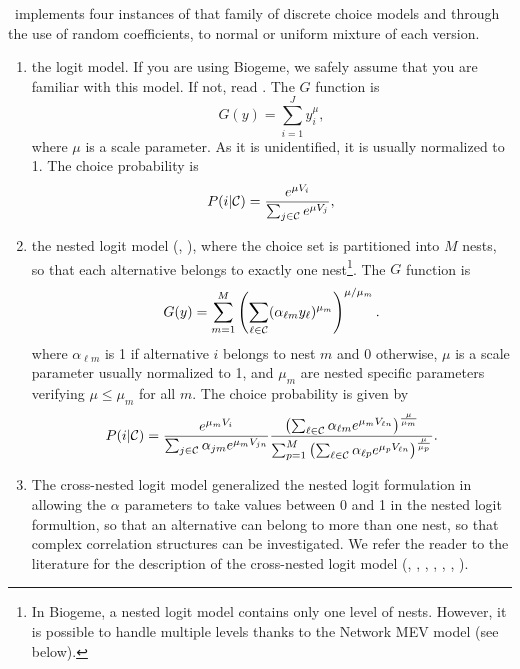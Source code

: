 \documentclass[12pt]{memoir}
\begin{document}
   \BIOGEME\ implements four instances of that family of discrete choice models and through the use 
   of random coefficients, to normal or uniform mixture of each version.
   \begin{enumerate}
      \item the logit model. If you are using Biogeme, we safely
         assume that you are  familiar with this model. If not, read
         . The $G$  function is
         \[
         G(y) = \sum_{i=1}^J y_i^\mu,
         \] 
         where $\mu$ is a scale parameter. As it is unidentified, it is
         usually normalized to 1. The choice probability is
\begin{equation}
  \label{eq:BAL5.8}
  P(i|\mathcal{C}) = \frac{e^{\mu V_{i}}}{\sum_{j\in \mathcal{C}} e^{\mu V_{j}}},
\end{equation}

         

      \item the nested logit model (\cite{BenA73}, 
         \cite{Daly87}), where the choice set is partitioned into $M$
         nests, so that each alternative belongs to exactly one nest\footnote{In Biogeme, a nested logit model contains only one level of nests. 
         However, it is possible to handle multiple levels thanks to
         the Network MEV model (see below).}. The $G$ function is
\begin{equation}
\label{eq:mev-nl}
G(y)= \sum_{m=1}^M \left( \sum_{\ell \in \mathcal{C}} (\alpha_{\ell m} y_\ell)^{\mu_m} \right)^{\mu/\mu_m}.
\end{equation}
         where $\alpha_{\ell m}$ is 1 if alternative $i$ belongs to nest
         $m$ and 0 otherwise,   $\mu$ is a scale parameter usually
         normalized to 1, and $\mu_m$ are nested specific parameters verifying 
  $\mu \leq \mu_m$ for all $m$. The choice probability is given by
\[
P(i|\mathcal{C}) =\frac{e^{\mu_m V_{i}}}{\sum_{j\in \mathcal{C}} \alpha_{jm} e^{\mu_m
    V_{jn}}}\frac{ \left( \sum_{\ell\in \mathcal{C}} \alpha_{\ell m}e^{\mu_m
    V_{\ell n}}\right)^{\frac{\mu}{\mu_m}}}{\sum_{p=1}^M\left(
  \sum_{\ell\in \mathcal{C}} \alpha_{\ell p}e^{\mu_p V_{\ell n}}\right)^{\frac{\mu}{\mu_p}}}.
\]


      \item The cross-nested logit model generalized the nested logit
        formulation in allowing the $\alpha$ parameters to take values
        between 0 and 1 in the nested logit formultion, so that an
        alternative can belong to more than one nest, so that complex
        correlation structures can be investigated. 
          We refer the reader to the
         literature for the description of the cross-nested logit model (\cite{Smal87},
         \cite{Vovs97},  \cite{BenABier03}, \cite{Papo04},
         \cite{Bier06-cnl}, \cite{WenKopp01}, \cite{AbbeBierTole07}).


\end{enumerate}
\end{document}
